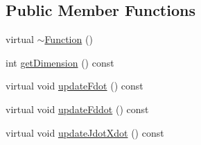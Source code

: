 \subsection*{Public Member Functions}
\begin{DoxyCompactItemize}
\item 
virtual \hyperlink{classocra_1_1Function_a1889abdbc50386e4b4710912dbba89bd}{$\sim$\+Function} ()
\item 
int \hyperlink{classocra_1_1Function_a85da5fba27502737b0c7027c24cc6170}{get\+Dimension} () const
\item 
virtual void \hyperlink{classocra_1_1Function_a2f09ce859333f22fdd527ff08aee6e6e}{update\+Fdot} () const
\item 
virtual void \hyperlink{classocra_1_1Function_a81490edf4f79b4dc730c5647e542231c}{update\+Fddot} () const
\item 
virtual void \hyperlink{classocra_1_1Function_a5b3356ce1094f19f4af6e38b319fdfe3}{update\+Jdot\+Xdot} () const
\end{DoxyCompactItemize}
{\bf }\par
